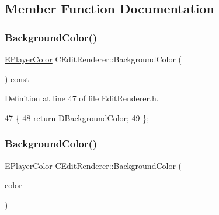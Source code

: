 \subsection{Member Function Documentation}
\hypertarget{classCEditRenderer_a531e5a92494375020328936efdf239d1}{}\label{classCEditRenderer_a531e5a92494375020328936efdf239d1} 
\subsubsection{\texorpdfstring{Background\+Color()}{BackgroundColor()}\hspace{0.1cm}{\footnotesize\ttfamily [1/2]}}
{\footnotesize\ttfamily \hyperlink{GameDataTypes_8h_aafb0ca75933357ff28a6d7efbdd7602f}{E\+Player\+Color} C\+Edit\+Renderer\+::\+Background\+Color (\begin{DoxyParamCaption}{ }\end{DoxyParamCaption}) const\hspace{0.3cm}{\ttfamily [inline]}}



Definition at line 47 of file Edit\+Renderer.\+h.


\begin{DoxyCode}
47                                             \{
48             \textcolor{keywordflow}{return} \hyperlink{classCEditRenderer_a7e5e1b18db4c53fe288c200aed673ccf}{DBackgroundColor};   
49         \};
\end{DoxyCode}
\hypertarget{classCEditRenderer_afc5aed55b1384142fbd096c7ffe2476f}{}\label{classCEditRenderer_afc5aed55b1384142fbd096c7ffe2476f} 
\subsubsection{\texorpdfstring{Background\+Color()}{BackgroundColor()}\hspace{0.1cm}{\footnotesize\ttfamily [2/2]}}
{\footnotesize\ttfamily \hyperlink{GameDataTypes_8h_aafb0ca75933357ff28a6d7efbdd7602f}{E\+Player\+Color} C\+Edit\+Renderer\+::\+Background\+Color (\begin{DoxyParamCaption}\item[{\hyperlink{GameDataTypes_8h_aafb0ca75933357ff28a6d7efbdd7602f}{E\+Player\+Color}}]{color }\end{DoxyParamCaption})\hspace{0.3cm}{\ttfamily [inline]}}



